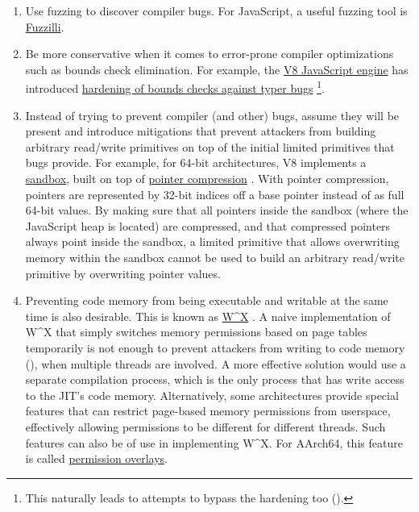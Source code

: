 \documentclass[
  a4paper,
]{report}
\providecommand{\tightlist}{%
  \setlength{\itemsep}{0pt}\setlength{\parskip}{0pt}}
\begin{document}
\begin{enumerate}
\def\labelenumi{\arabic{enumi}.}
\tightlist
\item
  Use fuzzing to discover compiler bugs. For JavaScript, a useful
  fuzzing tool is
  \href{https://github.com/googleprojectzero/fuzzilli}{Fuzzilli}.
\item
  Be more conservative when it comes to error-prone compiler
  optimizations such as bounds check elimination. For example, the
  \href{https://v8.dev/}{V8 JavaScript engine} has introduced
  \href{https://bugs.chromium.org/p/v8/issues/detail?id=8806}{hardening
  of bounds checks against typer bugs} \footnote{This naturally leads to
    attempts to bypass the hardening too
    ().}.
\item
  Instead of trying to prevent compiler (and other) bugs, assume they
  will be present and introduce mitigations that prevent attackers from
  building arbitrary read/write primitives on top of the initial limited
  primitives that bugs provide. For example, for 64-bit architectures,
  V8 implements a
  \href{https://docs.google.com/document/d/1FM4fQmIhEqPG8uGp5o9A-mnPB5BOeScZYpkHjo0KKA8/edit}{sandbox},
  built on top of \href{https://v8.dev/blog/pointer-compression}{pointer
  compression} . With pointer compression,
  pointers are represented by 32-bit indices off a base pointer instead
  of as full 64-bit values. By making sure that all pointers inside the
  sandbox (where the JavaScript heap is located) are compressed, and
  that compressed pointers always point inside the sandbox, a limited
  primitive that allows overwriting memory within the sandbox cannot be
  used to build an arbitrary read/write primitive by overwriting pointer
  values.
\item
  Preventing code memory from being executable and writable at the same
  time is also desirable. This is known as
  \href{https://en.wikipedia.org/wiki/W\%5EX}{W\^{}X} . A
  naive implementation of W\^{}X that simply switches memory permissions
  based on page tables temporarily is not enough to prevent attackers
  from writing to code memory (), when multiple threads are involved. A more effective solution
  would use a separate compilation process, which is the only process
  that has write access to the JIT's code memory. Alternatively, some
  architectures provide special features that can restrict page-based
  memory permissions from userspace, effectively allowing permissions to
  be different for different threads. Such features can also be of use
  in implementing W\^{}X. For AArch64, this feature is called
  \href{https://developer.arm.com/documentation/102376/0200/Permission-indirection-and-permission-overlay-extensions}{permission
  overlays}.
\end{enumerate}
\end{document}
